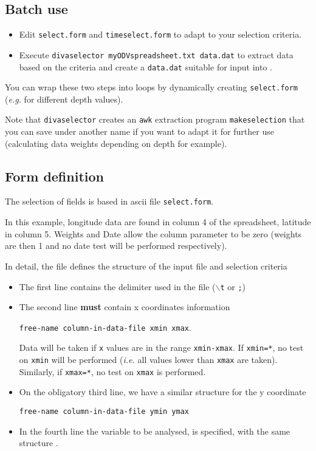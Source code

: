 \subsection{Batch use}

\begin{itemize}
\item Edit {\tt select.form} and {\tt timeselect.form} to adapt to your selection criteria.
\item Execute {\tt divaselector myODVspreadsheet.txt data.dat} to extract data based on the criteria and create a {\tt data.dat} suitable for input into \diva.
\end{itemize}

You can wrap these two steps into loops by dynamically creating {\tt select.form} (\textit{e.g.} for different depth values).

Note that {\tt divaselector} creates an {\tt awk} extraction program {\tt makeselection} that you can save under another name if you want to adapt it for further use (calculating data weights depending on depth for example).




\subsection{Form definition}

The selection of fields is based in ascii file {\tt select.form}. 

In this example, longitude data are found in column 4 of the spreadsheet, latitude in column 5.
Weights and Date allow the column parameter to be zero (weights are then 1 and no date test will be performed respectively).

In detail, the file defines the structure of the input file and selection criteria
\begin{itemize}
\item
The first line contains the delimiter used in the file ($\backslash${\tt t} or {\tt ;})
\item 
The second line {\bf must} contain x coordinates information

{\tt free-name  column-in-data-file  xmin xmax}. 

Data will be taken if \texttt{x} values are in the range \texttt{xmin-xmax}. If \texttt{xmin=*}, no test on \texttt{xmin} will be performed (\textit{i.e.} all values lower than \texttt{xmax} are taken). Similarly, if \texttt{xmax=*}, no test on \texttt{xmax} is performed.

\item On the obligatory third line, we have a similar structure for the y coordinate
 
{\tt free-name  column-in-data-file  ymin ymax}

\item In the fourth line the variable to be analysed, is specified, with the same structure .

\end{itemize}


